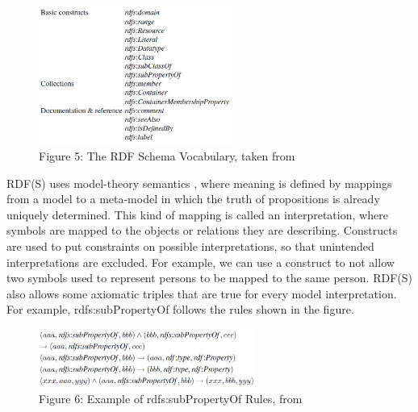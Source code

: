 \documentclass[10pt,journal,compsoc]{IEEEtran}
\begin{document}
\begin{figure}[htbp] %
   \centering
   \includegraphics[width=2.5in]{RDFSchemaVocabPic.jpg} 
  \caption*{Figure 5: The RDF Schema Vocabulary, taken from \cite{_social_2007}}
   \label{}
\label{}   
\end{figure}



RDF(S) uses model-theory semantics , where meaning is defined by mappings from a model to a meta-model in which the truth of propositions is already uniquely determined.  This kind of mapping is called an interpretation, where symbols are mapped to the objects or relations they are describing. Constructs are used to put constraints on possible interpretations, so that unintended interpretations are excluded.  For example, we can use a construct to not allow two symbols used to represent persons to be mapped to the same person.
RDF(S) also allows some axiomatic triples that are true for every model interpretation.  For example, rdfs:subPropertyOf follows the rules shown in the figure.

\begin{figure}[htbp] %
   \centering
   \includegraphics[width=2.8in]{subPropertyOfRules.jpg} 
  \caption*{Figure 6: Example of rdfs:subPropertyOf Rules, from \cite{_social_2007}}
   \label{}
\label{}   
\end{figure}
\end{document}
